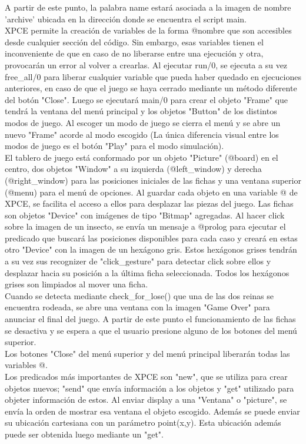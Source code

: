\documentclass[a4paper,12pt]{article}
\begin{document}
A partir de este punto, la palabra name estará asociada a la imagen de nombre 'archive' ubicada en la dirección donde se encuentra el script main.\\
XPCE permite la creación de variables de la forma @nombre que son accesibles desde cualquier sección del código. Sin embargo, esas variables tienen el inconveniente de que en caso de no liberarse entre una ejecución y otra, provocarán un error al volver a crearlas. Al ejecutar run/0, se ejecuta a su vez free\_all/0 para liberar cualquier variable que pueda haber quedado en ejecuciones anteriores, en caso de que el juego se haya cerrado mediante un método diferente del botón "Close". Luego se ejecutará main/0 para crear el objeto "Frame" que tendrá la ventana del menú principal y los objetos "Button" de los distintos modos de juego. Al escoger un modo de juego se cierra el menú y se abre un nuevo "Frame" acorde al modo escogido (La única diferencia visual entre los modos de juego es el botón "Play" para el modo simulación).\\
El tablero de juego está conformado por un objeto "Picture" (@board) en el centro, dos objetos "Window" a su izquierda (@left\_window) y derecha (@right\_window) para las posiciones iniciales de las fichas y una ventana superior (@menu) para el menú de opciones. Al guardar cada objeto en una variable @ de XPCE, se facilita el acceso a ellos para desplazar las piezas del juego. Las fichas son objetos "Device" con imágenes de tipo "Bitmap" agregadas. Al hacer click sobre la imagen de un insecto, se envía un mensaje a @prolog para ejecutar el predicado que buscará las posiciones disponibles para cada caso y creará en estas otro "Device" con la imagen de un hexágono gris. Estos hexágonos grises tendrán a su vez sus recognizer de "click\_gesture" para detectar click sobre ellos y desplazar hacia su posición a la última ficha seleccionada. Todos los hexágonos grises son limpiados al mover una ficha.\\
Cuando se detecta mediante check\_for\_lose() que una de las dos reinas se encuentra rodeada, se abre una ventana con la imagen "Game Over" para anunciar el final del juego. A partir de este punto el funcionamiento de las fichas se desactiva y se espera a que el usuario presione alguno de los botones del menú superior.\\
Los botones "Close" del menú superior y del menú principal liberarán todas las variables @.\\
Los predicados más importantes de XPCE son "new", que se utiliza para crear objetos nuevos; "send" que envía información a los objetos y "get" utilizado para objeter información de estos. Al enviar display a una "Ventana" o "picture", se envía la orden de mostrar esa ventana el objeto escogido. Además se puede enviar su ubicación cartesiana con un parámetro point(x,y). Esta ubicación además puede ser obtenida luego mediante un "get".\\
\end{document}
